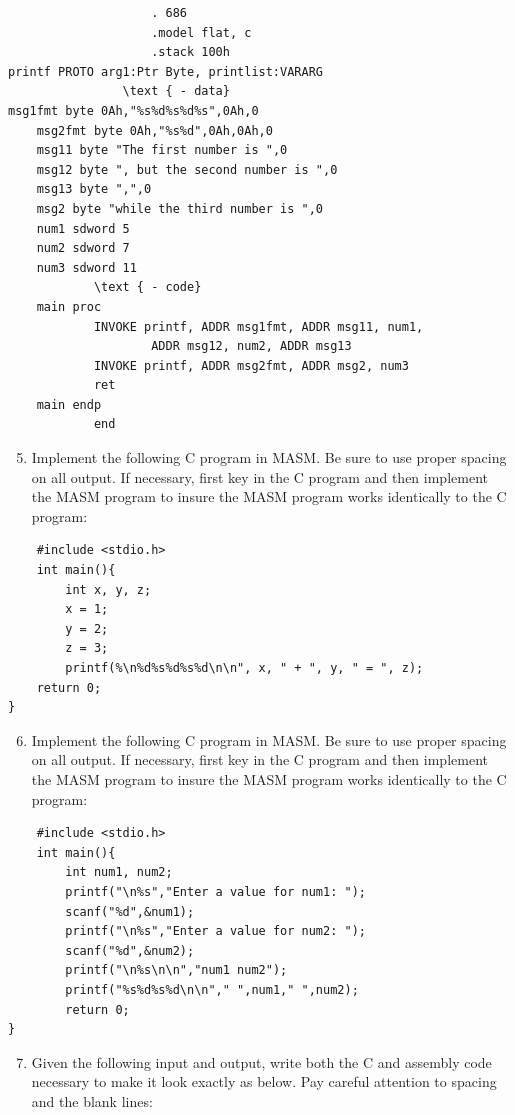\documentclass[10pt]{article}
\begin{document}
\begin{verbatim}
                    . 686
                    .model flat, c
                    .stack 100h
printf PROTO arg1:Ptr Byte, printlist:VARARG
                \text { - data}
msg1fmt byte 0Ah,"%s%d%s%d%s",0Ah,0
    msg2fmt byte 0Ah,"%s%d",0Ah,0Ah,0
    msg11 byte "The first number is ",0
    msg12 byte ", but the second number is ",0
    msg13 byte ",",0
    msg2 byte "while the third number is ",0
    num1 sdword 5
    num2 sdword 7
    num3 sdword 11
            \text { - code}
    main proc
            INVOKE printf, ADDR msg1fmt, ADDR msg11, num1,
                    ADDR msg12, num2, ADDR msg13
            INVOKE printf, ADDR msg2fmt, ADDR msg2, num3
            ret
    main endp
            end
\end{verbatim}

\begin{enumerate}
  \setcounter{enumi}{4}
  \item Implement the following C program in MASM. Be sure to use proper spacing on all output. If necessary, first key in the C program and then implement the MASM program to insure the MASM program works identically to the C program:
\end{enumerate}

\begin{verbatim}
    #include <stdio.h>
    int main(){
        int x, y, z;
        x = 1;
        y = 2;
        z = 3;
        printf(%\n%d%s%d%s%d\n\n", x, " + ", y, " = ", z);
    return 0;
}
\end{verbatim}

\begin{enumerate}
  \setcounter{enumi}{5}
  \item Implement the following C program in MASM. Be sure to use proper spacing on all output. If necessary, first key in the C program and then implement the MASM program to insure the MASM program works identically to the C program:
\end{enumerate}

\begin{verbatim}
    #include <stdio.h>
    int main(){
        int num1, num2;
        printf("\n%s","Enter a value for num1: ");
        scanf("%d",&num1);
        printf("\n%s","Enter a value for num2: ");
        scanf("%d",&num2);
        printf("\n%s\n\n","num1 num2");
        printf("%s%d%s%d\n\n"," ",num1," ",num2);
        return 0;
}
\end{verbatim}

\begin{enumerate}
  \setcounter{enumi}{6}
  \item Given the following input and output, write both the C and assembly code necessary to make it look exactly as below. Pay careful attention to spacing and the blank lines:
\end{enumerate}
\end{document}
